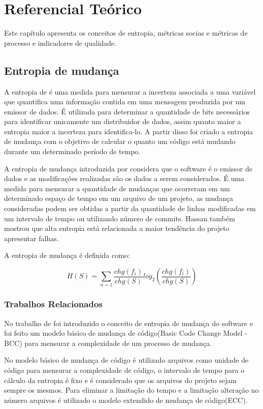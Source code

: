 \chapter{Referencial Teórico}
Este capítulo apresenta os conceitos de entropia, métricas socias e métricas de processo e indicadores de qualidade.

\section{Entropia de mudança}
A entropia de  é uma medida para mensurar a incerteza associada a uma variável que quantifica uma informação contida em uma mensagem produzida por um emissor de dados. É utilizada para determinar a quantidade de bits necessários para identificar unicamente um distribuidor de dados, assim quanto maior a entropia maior a incerteza para identifica-lo. A partir disso foi criado a entropia de mudança com o objetivo de calcular o quanto um código está mudando durante um determinado período de tempo. 

A entropia de mudança introduzida por  considera que o software é o emissor de dados e as modificações realizadas são os dados a serem considerados. É uma medida para mensurar a quantidade de mudanças que ocorreram em um determinado espaço de tempo em um arquivo de um projeto, as mudança consideradas podem ser obtidas a partir da quantidade de linhas modificadas em um intervalo de tempo ou utilizando número de commits. Hassan também mostrou que alta entropia está relacionada a maior tendência do projeto apresentar falhas.

A entropia de mudança é definida como:

\begin{equation}
H(S) = {\sum\limits_{n=1} }\frac{chg(f_i)}{chg(S)}log_2(\frac{chg(f_i)}{chg(S)})
\end{equation}

\subsection{Trabalhos Relacionados}
No trabalho de  foi introduzido o conceito de entropia de mudança do software e foi feito um modelo básico de mudança de código(Basic Code Change Model - BCC) para mensurar a complexidade de um processo de mudança.

No modelo básico de mudança de código é utilizado arquivos como unidade de código para mensurar a complexidade de código, o intervalo de tempo para o cálculo da entropia é fixo e é considerado que os arquivos do projeto sejam sempre os mesmos. Para eliminar a limitação do tempo e a limitação alteração no número arquivos é utilizado o modelo extendido de mudança de código(ECC).

